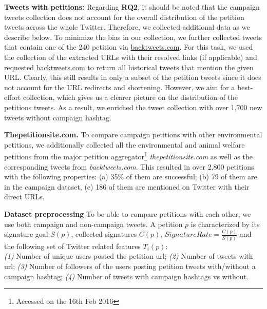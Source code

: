 \textbf{Tweets with petitions:}
Regarding \textbf{RQ2},
it should be noted that the campaign tweets collection does not account for the overall distribution of the petition tweets across the whole Twitter. 
Therefore, we collected additional data as we describe below.
To minimize the bias in our collection, we further collected tweets that contain one of the 240 petition via \url{backtweets.com}. For this task, we used the collection of the extracted URLs with their resolved links (if applicable) and requested \url{backtweets.com} to return all historical tweets that mention the given URL.
Clearly, this still results in only a subset of the petition tweets since it does not account for the URL redirects and shortening. However, we aim for a best-effort collection, which gives us a clearer picture on the distribution of the petitions tweets.
As a result, we enriched the tweet collection with over 1,700 new tweets without campaign hashtag.

\textbf{Thepetitionsite.com.} To compare campaign petitions with other environmental petitions, we additionally collected all the environmental and animal welfare petitions from the major petition aggregator\footnote{Accessed on the 16th Feb 2016} \textit{thepetitionsite.com} as well as the corresponding tweets from \textit{backtweets.com}. This resulted in over 2,800 petitions with the following properties: (a) 35\% of them are successful; (b) 79 of them are in the campaign dataset, (c) 186 of them are mentioned on Twitter with their direct URLs.

\textbf{Dataset preprocessing}
To be able to compare petitions with each other, we use both campaign and non-campaign tweets.
A petition $p$ is characterized by its signature goal $S(p)$, collected signatures $C(p)$, $SignatureRate = \frac{C(p)}{S(p)}$ and the following set of Twitter related features $T_i(p)$:\\
\textit{(1)} Number of unique users posted the petition url; 
\textit{(2)} Number of tweets with url;
\textit{(3)} Number of followers of the users posting petition tweets with/without a campaign hashtag;
\textit{(4)} Number of tweets with campaign hashtags vs without.